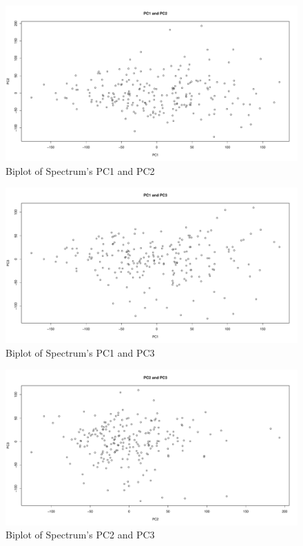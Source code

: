 \begin{figure}[H]
    \centering
    \includegraphics[width=12cm]{images/PCA (Spec)/PC1 and PC2.pdf}  
    \caption{Biplot of Spectrum's PC1 and PC2}
    \label{fig:PCASpec12biplot} 
\end{figure}

\begin{figure}[H]
    \centering
    \includegraphics[width=12cm]{images/PCA (Spec)/PC1 and PC3.pdf}
    \caption{Biplot of Spectrum's PC1 and PC3}
    \label{fig:PCASpec13biplot} 
\end{figure}

\begin{figure}[H]
    \centering
    \includegraphics[width=12cm]{images/PCA (Spec)/PC2 and PC3.pdf}
    \caption{Biplot of Spectrum's PC2 and PC3}
    \label{fig:PCASpec23biplotd} 
\end{figure}

